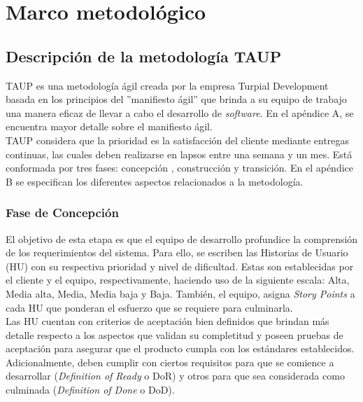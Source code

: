 \chapter{\textbf{Marco metodológico}}

\thispagestyle{empty}

\section{Descripción de la metodología TAUP}

TAUP es una metodología ágil creada por la empresa Turpial Development basada en los principios del ”manifiesto ágil” que brinda a su equipo de trabajo una manera eficaz de llevar a cabo el desarrollo de \textit{software}. En el apéndice A, se encuentra mayor detalle sobre el manifiesto ágil. \\

TAUP considera que la prioridad es la satisfacción del cliente mediante entregas continuas, las cuales deben realizarse en lapsos entre una semana y un mes. Está conformada por tres fases: concepción , construcción y transición. En el apéndice B se especifican los diferentes aspectos relacionados a la metodología.

\subsection{Fase de Concepción}

El objetivo de esta etapa es que el equipo de desarrollo profundice la comprensión de los requerimientos del sistema. Para ello, se escriben las Historias de Usuario (HU) con su respectiva prioridad y nivel de dificultad. Estas son establecidas por el cliente y el equipo, respectivamente, haciendo uso de la siguiente escala: Alta, Media alta, Media, Media baja y Baja. También, el equipo, asigna \textit{Story Points} a cada HU que ponderan el esfuerzo que se requiere para culminarla.\\

Las HU cuentan con criterios de aceptación bien definidos que brindan más detalle respecto a los aspectos que validan su completitud y poseen pruebas de aceptación para asegurar que el producto cumpla con los estándares establecidos. Adicionalmente, deben cumplir con ciertos requisitos para que se comience a desarrollar (\textit{Definition of Ready} o DoR) y otros para que sea considerada como culminada (\textit{Definition of Done} o DoD).\\

